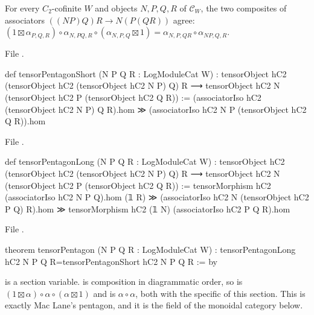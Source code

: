 \begin{theorem}\label{l21:thm:logpent}
For every $C_2$-cofinite $W$ and objects $N,P,Q,R$ of $\mathcal C_W$, the two composites of associators
$((NP)Q)R\to N(P(QR))$ agree:
$(1\boxtimes\alpha_{P,Q,R})\circ\alpha_{N,PQ,R}\circ(\alpha_{N,P,Q}\boxtimes1)=\alpha_{N,P,QR}\circ\alpha_{NP,Q,R}$.
\end{theorem}
\noindent File .
\begin{leancode}
def tensorPentagonShort (N P Q R : LogModuleCat W) :
    tensorObject hC2 (tensorObject hC2 (tensorObject hC2 N P) Q) R ⟶
      tensorObject hC2 N (tensorObject hC2 P (tensorObject hC2 Q R)) :=
  (associatorIso hC2 (tensorObject hC2 N P) Q R).hom ≫
    (associatorIso hC2 N P (tensorObject hC2 Q R)).hom
\end{leancode}
\noindent File .
\begin{leancode}
def tensorPentagonLong (N P Q R : LogModuleCat W) :
    tensorObject hC2 (tensorObject hC2 (tensorObject hC2 N P) Q) R ⟶
      tensorObject hC2 N (tensorObject hC2 P (tensorObject hC2 Q R)) :=
  tensorMorphism hC2 (associatorIso hC2 N P Q).hom (𝟙 R) ≫
    (associatorIso hC2 N (tensorObject hC2 P Q) R).hom ≫
      tensorMorphism hC2 (𝟙 N) (associatorIso hC2 P Q R).hom
\end{leancode}
\noindent File .
\begin{leancode}
theorem tensorPentagon (N P Q R : LogModuleCat W) :
    tensorPentagonLong hC2 N P Q R=tensorPentagonShort hC2 N P Q R := by
\end{leancode}

\begin{dictionary}
 is a section variable.  is composition in diagrammatic order, so
 is $(1\boxtimes\alpha)\circ\alpha\circ(\alpha\boxtimes1)$ and  is
$\alpha\circ\alpha$, both with the specific  of this section. This is exactly Mac Lane's pentagon,
and it is the  field of the monoidal category below.
\end{dictionary}

